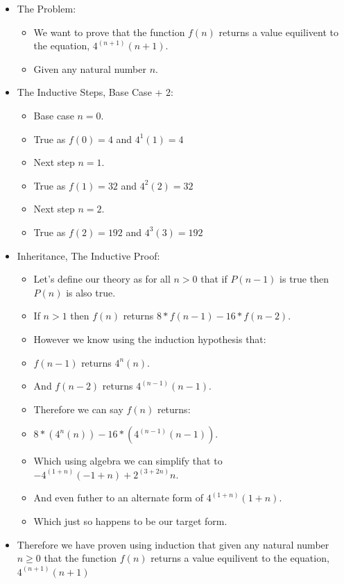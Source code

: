 \documentclass{article}
\begin{document}
\begin{enumerate}
\begin{enumerate}
      \begin{itemize}
        \item The Problem:
        \begin{itemize}
          \item We want to prove that the function $f(n)$ returns a value equilivent to the equation, $4^{(n + 1)}(n + 1)$.
          \item Given any natural number $n$.
        \end{itemize}
        \item The Inductive Steps, Base Case + 2:
        \begin{itemize}
          \item Base case $n = 0$. 
          \item True as $f(0) = 4$ and $4^1(1) = 4$
          \item Next step $n = 1$. 
          \item True as $f(1) = 32$ and $4^2(2) = 32$
          \item Next step $n = 2$. 
          \item True as $f(2) = 192$ and $4^3(3) = 192$
        \end{itemize}
        \item Inheritance, The Inductive Proof:
        \begin{itemize}
          \item Let's define our theory as for all $n > 0$ that if $P(n - 1)$ is true then $P(n)$ is also true. 
          \item If $n > 1$ then $f(n)$ returns $8*f(n - 1) - 16*f(n - 2)$. 
          \item However we know using the induction hypothesis that:          
          \item $f(n - 1)$ returns $4^n(n)$.
          \item And $f(n - 2)$ returns $4^{(n - 1)}(n - 1)$.
          \item Therefore we can say $f(n)$ returns:
          \item $8*(4^n(n)) - 16*(4^{(n - 1)}(n - 1))$.
          \item Which using algebra we can simplify that to $-4^{(1 + n)} (-1 + n) + 2^{(3 + 2 n)} n$.
          \item And even futher to an alternate form of $4^{(1 + n)} (1 + n)$.
          \item Which just so happens to be our target form.
        \end{itemize}
        \item Therefore we have proven using induction that given any natural number $n \geq 0$ that the function $f(n)$ returns a value equilivent to the equation, $4^{(n + 1)}(n + 1)$
      \end{itemize}
    \end{enumerate}


\end{enumerate}
\end{document}
